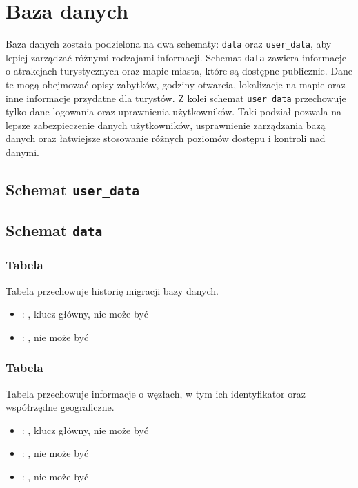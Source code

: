 \section{Baza danych}
Baza danych została podzielona na dwa schematy: \texttt{data} oraz \texttt{user\_data}, aby lepiej zarządzać różnymi rodzajami informacji.
Schemat \texttt{data} zawiera informacje o atrakcjach turystycznych oraz mapie miasta, które są dostępne publicznie.
Dane te mogą obejmować opisy zabytków, godziny otwarcia, lokalizacje na mapie oraz inne informacje przydatne dla turystów.
Z kolei schemat \texttt{user\_data} przechowuje tylko dane logowania oraz uprawnienia użytkowników.
Taki podział pozwala na lepsze zabezpieczenie danych użytkowników, usprawnienie zarządzania bazą danych oraz łatwiejsze stosowanie różnych poziomów dostępu i kontroli nad danymi.

\subsection{Schemat \texttt{user\_data}}

\subsection{Schemat \texttt{data}}

\subsubsection{Tabela }
Tabela przechowuje historię migracji bazy danych.
\begin{itemize}
    \item {}: , klucz główny, nie może być 
    \item {}: , nie może być 
\end{itemize}

\subsubsection{Tabela }
Tabela przechowuje informacje o węzłach, w tym ich identyfikator oraz współrzędne geograficzne.
\begin{itemize}
    \item {}: , klucz główny, nie może być 
    \item {}: , nie może być 
    \item {}: , nie może być 
\end{itemize}

